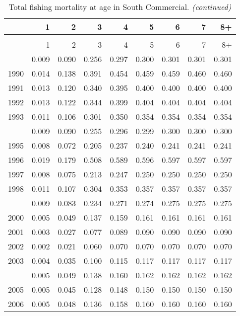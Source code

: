 \documentclass[
]{article}
\begin{document}
\begin{longtable}[t]{lrrrrrrrr}
\caption{\label{tab:South_Commercial-fleet-FAA-table}Total fishing mortality at age in South Commercial.}\\
\toprule
  & 1 & 2 & 3 & 4 & 5 & 6 & 7 & 8+\\
\midrule
\endfirsthead
\caption[]{Total fishing mortality at age in South Commercial. \textit{(continued)}}\\
\toprule
  & 1 & 2 & 3 & 4 & 5 & 6 & 7 & 8+\\
\midrule
\endhead

\endfoot
\bottomrule
\endlastfoot
1989 & 0.009 & 0.090 & 0.256 & 0.297 & 0.300 & 0.301 & 0.301 & 0.301\\
1990 & 0.014 & 0.138 & 0.391 & 0.454 & 0.459 & 0.459 & 0.460 & 0.460\\
1991 & 0.013 & 0.120 & 0.340 & 0.395 & 0.400 & 0.400 & 0.400 & 0.400\\
1992 & 0.013 & 0.122 & 0.344 & 0.399 & 0.404 & 0.404 & 0.404 & 0.404\\
1993 & 0.011 & 0.106 & 0.301 & 0.350 & 0.354 & 0.354 & 0.354 & 0.354\\
\addlinespace
1994 & 0.009 & 0.090 & 0.255 & 0.296 & 0.299 & 0.300 & 0.300 & 0.300\\
1995 & 0.008 & 0.072 & 0.205 & 0.237 & 0.240 & 0.241 & 0.241 & 0.241\\
1996 & 0.019 & 0.179 & 0.508 & 0.589 & 0.596 & 0.597 & 0.597 & 0.597\\
1997 & 0.008 & 0.075 & 0.213 & 0.247 & 0.250 & 0.250 & 0.250 & 0.250\\
1998 & 0.011 & 0.107 & 0.304 & 0.353 & 0.357 & 0.357 & 0.357 & 0.357\\
\addlinespace
1999 & 0.009 & 0.083 & 0.234 & 0.271 & 0.274 & 0.275 & 0.275 & 0.275\\
2000 & 0.005 & 0.049 & 0.137 & 0.159 & 0.161 & 0.161 & 0.161 & 0.161\\
2001 & 0.003 & 0.027 & 0.077 & 0.089 & 0.090 & 0.090 & 0.090 & 0.090\\
2002 & 0.002 & 0.021 & 0.060 & 0.070 & 0.070 & 0.070 & 0.070 & 0.070\\
2003 & 0.004 & 0.035 & 0.100 & 0.115 & 0.117 & 0.117 & 0.117 & 0.117\\
\addlinespace
2004 & 0.005 & 0.049 & 0.138 & 0.160 & 0.162 & 0.162 & 0.162 & 0.162\\
2005 & 0.005 & 0.045 & 0.128 & 0.148 & 0.150 & 0.150 & 0.150 & 0.150\\
2006 & 0.005 & 0.048 & 0.136 & 0.158 & 0.160 & 0.160 & 0.160 & 0.160\\

\end{longtable}
\end{document}
